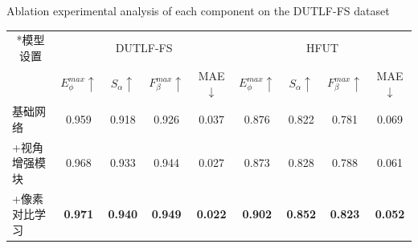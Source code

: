 \begin{table}[!hb]
	{Ablation experimental analysis of each component on the DUTLF-FS dataset}
	\centering
	\label{chpt4:tab:abl_tot}
		\begin{tabular}{lcccccccc}
			\toprule[2pt]  %
			
			\multicolumn{1}{c}{ \multirow{2}*{模型设置}}	& \multicolumn{4}{c}{DUTLF-FS} & \multicolumn{4}{c}{HFUT} \\ 
			
			
			\cmidrule(r){2-5} \cmidrule(r){6-9} 
			
			& $E_{\phi}^{max}\uparrow$ & $S_{\alpha }\uparrow $ & $F_{\beta}^{max}\uparrow$ & MAE$\downarrow$ 
			& $E_{\phi}^{max}\uparrow$ & $S_{\alpha }\uparrow $ & $F_{\beta}^{max}\uparrow$ & MAE$\downarrow$
			\\
			
			\midrule
			
			
			基础网络     & 0.959 & 0.918 & 0.926 & 0.037 & 0.876 & 0.822 & 0.781 & 0.069   \\
			+视角增强模块 & 0.968 & 0.933 & 0.944 & 0.027 & 0.873 & 0.828 & 0.788 & 0.061   \\
			
			
			
			+像素对比学习
			& \textbf{0.971} & \textbf{0.940} & \textbf{0.949} & \textbf{0.022} 
			& \textbf{0.902} & \textbf{0.852} & \textbf{0.823} & \textbf{0.052}  
			\\
			
			
			\bottomrule[2pt]
		\end{tabular}
\end{table}




